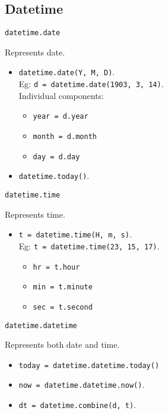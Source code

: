 \subsection{Datetime}

\begin{center}
   \large{\texttt{datetime.date}} 
\end{center}
Represents date.
\begin{itemize}
\item \texttt{datetime.date(Y, M, D)}.\\
        Eg: \texttt{d = datetime.date(1903, 3, 14)}.\\
        Individual components:
        \begin{itemize}
        \item \texttt{year = d.year}
        \item \texttt{month = d.month}
        \item \texttt{day = d.day}
        \end{itemize}
\item \texttt{datetime.today()}.\\
\end{itemize}

\begin{center}
    \large{\texttt{datetime.time}}
\end{center}
Represents time.

\begin{itemize}
\item \texttt{t = datetime.time(H, m, s)}.\\
    Eg: \texttt{t = datetime.time(23, 15, 17)}.\\
    \begin{itemize}
    \item \texttt{hr = t.hour}\\
    \item \texttt{min = t.minute}\\
    \item \texttt{sec = t.second}\\
    \end{itemize}
\end{itemize}

\begin{center}
    \large{\texttt{datetime.datetime}}
\end{center}

Represents both date and time.

\begin{itemize}
    \item \texttt{today = datetime.datetime.today()}
    \item \texttt{now = datetime.datetime.now()}.
    \item \texttt{dt = datetime.combine(d, t)}.
\end{itemize}



